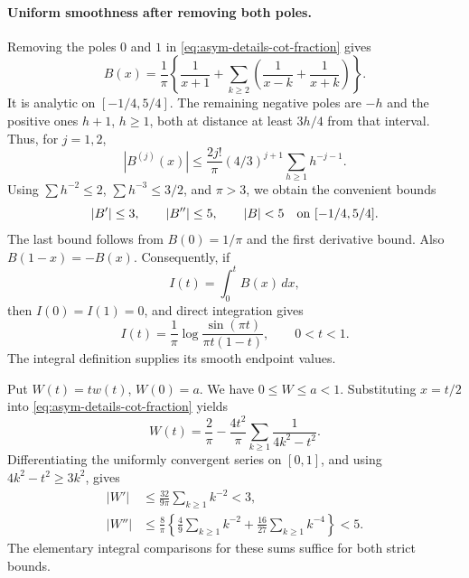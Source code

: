 \paragraph{Uniform smoothness after removing both poles.}
Removing the poles $0$ and $1$ in
\eqref{eq:asym-details-cot-fraction} gives
\begin{equation}\label{eq:asym-details-B-series}
 B(x)=\frac1\pi\left\{\frac1{x+1}
       +\sum_{k\geq2}\left(\frac1{x-k}+\frac1{x+k}\right)\right\}.
\end{equation}
It is analytic on $[-1/4,5/4]$.  The remaining negative poles are
$-h$ and the positive ones $h+1$, $h\geq1$, both at distance
at least $3h/4$ from that interval.  Thus, for $j=1,2$,
\[
 |B^{(j)}(x)|\leq\frac{2j!}{\pi}(4/3)^{j+1}
                    \sum_{h\geq1}h^{-j-1}.
\]
Using $\sum h^{-2}\leq2$, $\sum h^{-3}\leq3/2$, and
$\pi>3$, we obtain the convenient bounds
\begin{equation}\label{eq:asym-details-B-bounds}
 |B'|\leq3,\qquad |B''|\leq5,\qquad |B|<5
                   \quad\hbox{on }[-1/4,5/4].
\end{equation}
The last bound follows from $B(0)=1/\pi$ and the first derivative
bound.  Also $B(1-x)=-B(x)$.  Consequently, if
\[
 I(t)=\int_0^t B(x)\,dx,
\]
then $I(0)=I(1)=0$, and direct integration gives
\begin{equation}\label{eq:asym-details-I-log}
 I(t)=\frac1\pi\log\frac{\sin(\pi t)}{\pi t(1-t)},
                      \qquad 0<t<1.
\end{equation}
The integral definition supplies its smooth endpoint values.

Put $W(t)=tw(t)$, $W(0)=a$.  We have $0\leq W\leq a<1$.
Substituting $x=t/2$ into
\eqref{eq:asym-details-cot-fraction} yields
\[
 W(t)=\frac2\pi-\frac{4t^2}{\pi}
                     \sum_{k\geq1}\frac1{4k^2-t^2}.
\]
Differentiating the uniformly convergent series on $[0,1]$, and using
$4k^2-t^2\geq3k^2$, gives
\begin{align*}
 |W'|&\leq\frac{32}{9\pi}\sum_{k\geq1}k^{-2}<3,\\
 |W''|&\leq\frac8\pi\left\{\frac49\sum_{k\geq1}k^{-2}
                       +\frac{16}{27}\sum_{k\geq1}k^{-4}\right\}<5.
\end{align*}
The elementary integral comparisons for these sums suffice for both
strict bounds.

